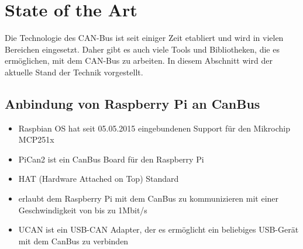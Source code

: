 \section{State of the Art}
Die Technologie des CAN-Bus ist seit einiger Zeit etabliert und wird in vielen Bereichen eingesetzt.
Daher gibt es auch viele Tools und Bibliotheken, die es ermöglichen, mit dem CAN-Bus zu arbeiten.
In diesem Abschnitt wird der aktuelle Stand der Technik vorgestellt.

\subsection{Anbindung von Raspberry Pi an CanBus}
\begin{itemize}
    \item Raspbian OS hat seit 05.05.2015 eingebundenen Support für den Mikrochip MCP251x
\end{itemize}
\cite{Salunkhe2016}
\begin{itemize}
    \item PiCan2 ist ein CanBus Board für den Raspberry Pi
    \item HAT (Hardware Attached on Top) Standard
    \item erlaubt dem Raspberry Pi mit dem CanBus zu kommunizieren mit einer Geschwindigkeit von bis zu 1Mbit/s
    \item UCAN ist ein USB-CAN Adapter, der es ermöglicht ein beliebiges USB-Gerät mit dem CanBus zu verbinden
\end{itemize}
\cite{Pant2019}

